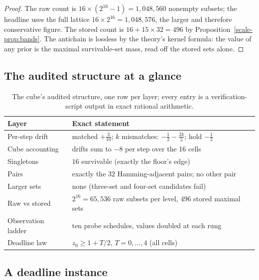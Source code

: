 \documentclass[10pt,twocolumn]{article}
\theoremstyle{plain}
\theoremstyle{definition}
\theoremstyle{remark}
\begin{document}
\begin{proof}
The raw count is \(16 \times (2^{16} - 1) = 1{,}048{,}560\) nonempty
subsets; the headline uses the full lattice
\(16 \times 2^{16} = 1{,}048{,}576\), the larger and therefore
conservative figure. The stored count is
\(16 + 15 \times 32 = 496\) by Proposition~\ref{scale-prop:bands}. The
antichain is lossless by the theory's kernel formula: the
value of any prior is the maximal survivable-set mass, read off the
stored sets alone.
\end{proof}

\subsection{The audited structure at a glance}\label{scale-glance}

\begin{table}[t]
\centering\footnotesize
\caption{The cube's audited structure, one row per layer; every entry is a
verification-script output in exact rational arithmetic.}
\label{scale-tab:glance}
\begin{tabular}{@{}l p{4.9cm}@{}}
\toprule
Layer & Exact statement \\
\midrule
Per-step drift & matched $+\tfrac3{10}$; $k$ mismatches: $-\tfrac12-\tfrac{2k}{5}$; hold $-\tfrac12$ \\
Cube accounting & drifts sum to $-8$ per step over the 16 cells \\
Singletons & $16$ survivable (exactly the floor's edge) \\
Pairs & exactly the $32$ Hamming-adjacent pairs; no other pair \\
Larger sets & none (three-set and four-set candidates fail) \\
Raw vs stored & $2^{16} = 65{,}536$ raw subsets per level, $496$ stored maximal sets \\
Observation ladder & ten probe schedules, values doubled at each rung \\
Deadline law & $z_0 \ge 1 + T/2$, $T = 0, \dots, 4$ (all cells) \\
\bottomrule
\end{tabular}
\end{table}

\subsection{A deadline instance}\label{scale-deadline}
\end{document}
